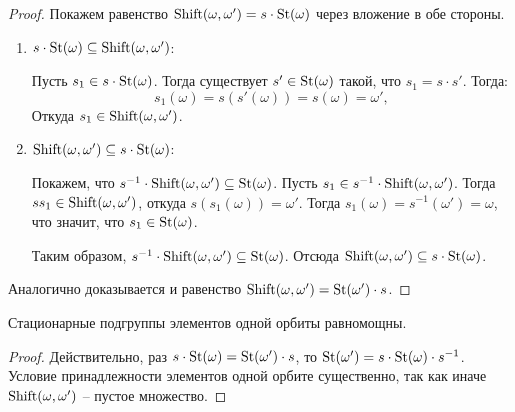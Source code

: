 \begin{proof}
    Покажем равенство $\operatorname{\text{Shift}}(\omega, \omega') = s \cdot \operatorname{\text{St}}(\omega)$ через вложение в обе стороны.
    \begin{enumerate}
        \item $s \cdot \operatorname{\text{St}}(\omega) \subseteq \operatorname{\text{Shift}}(\omega, \omega')$:
        
        Пусть $s_1 \in s \cdot \operatorname{\text{St}}(\omega)$. Тогда существует $s' \in \operatorname{\text{St}}(\omega)$ 
        такой, что $s_1 = s \cdot s'$. 
        Тогда: $$s_1(\omega) = s(s'(\omega)) = s(\omega) = \omega',$$ Откуда 
        $s_1 \in \operatorname{\text{Shift}}(\omega, \omega')$.
        \item $\operatorname{\text{Shift}}(\omega, \omega') \subseteq s \cdot \operatorname{\text{St}}(\omega)$:
        
        Покажем, что $s^{-1} \cdot \operatorname{\text{Shift}}(\omega, \omega') \subseteq \operatorname{\text{St}}(\omega)$. Пусть 
        $s_1 \in s^{-1} \cdot \operatorname{\text{Shift}}(\omega, \omega')$. Тогда $s s_1 \in \operatorname{\text{Shift}}(\omega, \omega')$, 
        откуда $s(s_1(\omega)) = \omega'$. Тогда $s_1(\omega) = s^{-1}(\omega') = \omega$, что значит, что 
        $s_1 \in \operatorname{\text{St}}(\omega)$.

        Таким образом, $s^{-1} \cdot \operatorname{\text{Shift}}(\omega, \omega') \subseteq \operatorname{\text{St}}(\omega)$. Отсюда 
        $\operatorname{\text{Shift}}(\omega, \omega') \subseteq s \cdot \operatorname{\text{St}}(\omega)$. 
    \end{enumerate}
    Аналогично доказывается и равенство $\operatorname{\text{Shift}}(\omega, \omega') = \operatorname{\text{St}}(\omega') \cdot s$.
\end{proof}

\begin{corollary}
    Стационарные подгруппы элементов одной орбиты равномощны.
\end{corollary}

\begin{proof}
    Действительно, раз $s \cdot \operatorname{\text{St}}(\omega) = \operatorname{\text{St}}(\omega') \cdot s$, то 
    $\operatorname{\text{St}}(\omega') = s \cdot \operatorname{\text{St}}(\omega) \cdot s^{-1}$.
    Условие принадлежности элементов одной орбите существенно, так как иначе $\operatorname{\text{Shift}}(\omega, \omega')$ 
    -- пустое множество.
\end{proof}

